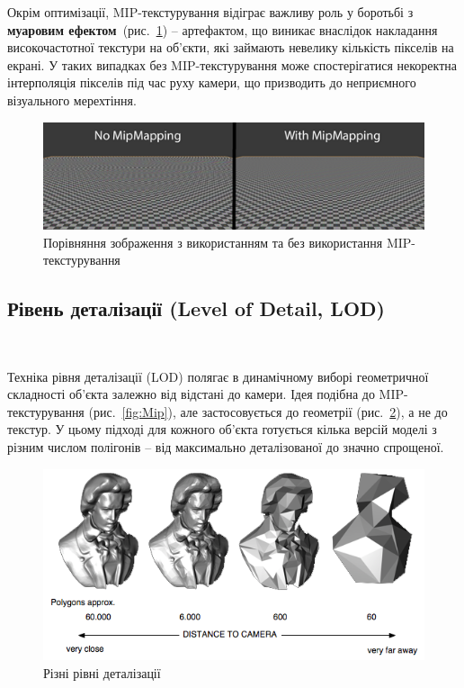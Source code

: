 Окрім оптимізації, MIP-текстурування відіграє важливу роль у боротьбі з \textbf{муаровим ефектом}~(рис.~\ref{fig:Muar}) -- артефактом, що виникає внаслідок накладання високочастотної текстури на об’єкти, які займають невелику кількість пікселів на екрані. У таких випадках без MIP-текстурування може спостерігатися некоректна інтерполяція пікселів під час руху камери, що призводить до неприємного візуального мерехтіння.

\begin{figure}[h]
  \centering
  \includegraphics[scale=0.8]{Pictures/Mipmap_Aliasing_Comparison.png}
  \caption{Порівняння зображення з використанням та без використання MIP-текстурування}
  \label{fig:Muar}
\end{figure}
\newpage
\subsection{Рівень деталізації (Level of Detail, LOD)} \mbox{}\
\par Техніка рівня деталізації (LOD) полягає в динамічному виборі гео\-мет\-рич\-ної складності об'єкта залежно від відстані до камери. Ідея подібна до MIP-текстурування (рис.~\ref{fig:Mip}), але застосовується до геометрії (рис.~\ref{fig:LOD}), а не до текстур. У цьому підході для кожного об'єкта готується кілька версій моделі з різ\-ним числом полігонів -- від максимально деталізованої до значно спрощеної.

\begin{figure}[h]
  \centering
  \includegraphics[scale=0.75]{Pictures/lod.png}
  \caption{Різні рівні деталізації}
  \label{fig:LOD}
\end{figure}

